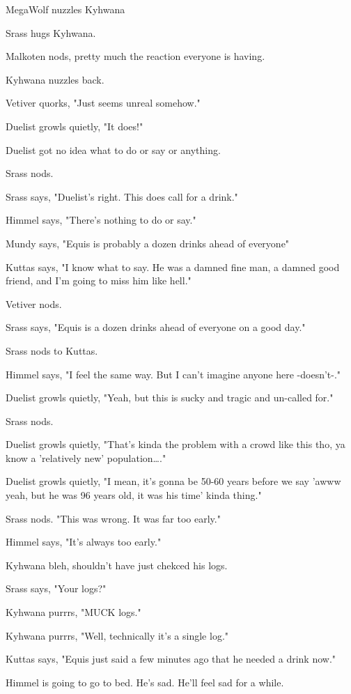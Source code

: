 \begin{hangparas}{2em}{1}
MegaWolf nuzzles Kyhwana

Srass hugs Kyhwana.

Malkoten nods, pretty much the reaction everyone is having.

Kyhwana nuzzles back.

Vetiver quorks, "Just seems unreal somehow."

Duelist growls quietly, "It does!"

Duelist got no idea what to do or say or anything.

Srass nods.

Srass says, "Duelist's right.  This does call for a drink."

Himmel says, "There's nothing to do or say."

Mundy says, "Equis is probably a dozen drinks ahead of everyone"

Kuttas says, "I know what to say. He was a damned fine man, a damned good friend, and I'm going to miss him like hell."

Vetiver nods.

Srass says, "Equis is a dozen drinks ahead of everyone on a good day."

Srass nods to Kuttas.

Himmel says, "I feel the same way. But I can't imagine anyone here -doesn't-."

Duelist growls quietly, "Yeah, but this is sucky and tragic and un-called for."

Srass nods.

Duelist growls quietly, "That's kinda the problem with a crowd like this tho, ya know a 'relatively new' population\ldots{}."

Duelist growls quietly, "I mean, it's gonna be 50-60 years before we say 'awww yeah, but he was 96 years old, it was his time' kinda thing."

Srass nods.  "This was wrong.  It was far too early."

Himmel says, "It's always too early."

Kyhwana bleh, shouldn't have just chekced his logs.

Srass says, "Your logs?"

Kyhwana purrrs, "MUCK logs."

Kyhwana purrrs, "Well, technically it's a single log."

Kuttas says, "Equis just said a few minutes ago that he needed a drink now."

Himmel is going to go to bed. He's sad. He'll feel sad for a while.


\end{hangparas}
